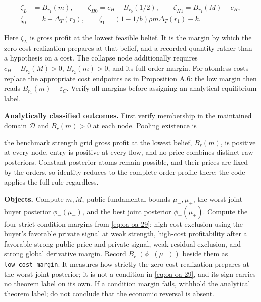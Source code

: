 \[
\begin{aligned}
\zeta_L&=B_{r_1}(m),\qquad
\zeta_{H0}=c_H-B_{r_0}(1/2),\qquad
\zeta_{H1}=B_{r_1}(M)-c_H,\\
\zeta_0&=k-\Delta_T(r_0),\qquad
\zeta_1=(1-1/b)\rho m\Delta_T(r_1)-k.
\end{aligned}
\tag{OA.77}\label{eq:oa-oa-77}
\]

Here \(\zeta_L\) is gross profit at the lowest feasible belief. It is the margin
by which the zero-cost realization prepares at that belief, and a recorded
quantity rather than a hypothesis on a cost. The collapse node additionally requires \(c_H-B_{r_2}(M)>0\),
\(B_{r_2}(m)>0\), and its full-order margin. For atomless costs
replace the appropriate cost endpoints as in Proposition A.6: the low margin
then reads \(B_{r_1}(m)-\varepsilon_C\). Verify all
margins before assigning an analytical equilibrium label.

\textbf{Analytically classified outcomes.} First verify membership in
the maintained domain \(\mathcal D\) and \(B_r(m)>0\) at each node. Pooling existence is

the benchmark strength grid gross profit at the lowest belief, \(B_r(m)\), is
positive at
every node, entry is positive at every flow, and no price combines
distinct raw posteriors. Constant-posterior atoms remain possible, and
their prices are fixed by the orders, so identity reduces to the
complete order profile there; the code applies the full rule regardless.

\textbf{Objects.} Compute \(m,M\), public fundamental bounds
\(\mu_-,\mu_+\), the worst joint buyer posterior \(\phi_-(\mu_-)\), and
the best joint posterior \(\phi_+(\mu_+)\). Compute the four strict
condition margins from \eqref{eq:oa-oa-29}: high-cost
exclusion using the buyer's favorable private signal at weak strength,
high-cost profitability after a favorable strong public price and
private signal, weak residual exclusion, and strong global derivative
margin. Record \(B_{r_1}(\phi_-(\mu_-))\) beside them as
\texttt{low\_cost\_margin}. It measures how strictly the zero-cost realization
prepares at the worst joint posterior; it is not a condition in
\eqref{eq:oa-oa-29}, and its sign carries no theorem label on its own.
If a condition margin fails, withhold the analytical theorem label; do not
conclude that the economic reversal is absent.

